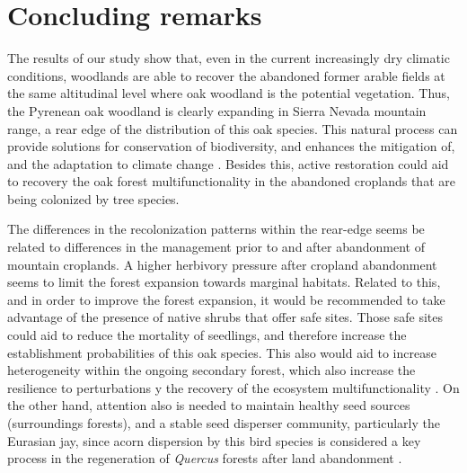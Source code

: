 \section{Concluding remarks}\label{sec:coloniza:Conclusion}
The results of our study show that, even in the current increasingly dry climatic conditions, \Qp woodlands are able to recover the abandoned former arable fields at the same altitudinal level where oak woodland is the potential vegetation. Thus, the Pyrenean oak woodland is clearly expanding in Sierra Nevada mountain range, a rear edge of the distribution of this oak species. This natural process can provide solutions for conservation of biodiversity, and enhances the mitigation of, and the adaptation to climate change \autocites[][and references therein]{Chazdonetal2020FosteringNatural}. Besides this, active restoration could aid to recovery the oak forest multifunctionality \autocite{CruzAlonsoetal2019LongTerm} in the abandoned croplands that are being colonized by tree species.

The differences in the recolonization patterns within the rear-edge seems be related to differences in the management prior to and after abandonment of mountain croplands. A higher herbivory pressure after cropland abandonment seems to limit the forest expansion towards marginal habitats. Related to this, and in order to improve the forest expansion, it would be recommended to take advantage of the presence of native shrubs that offer safe sites. Those safe sites could aid to reduce the mortality of \Qp seedlings, and therefore increase the establishment probabilities of this oak species. This also would aid to increase heterogeneity within the ongoing secondary forest, which also increase the resilience to perturbations y the recovery of the ecosystem multifunctionality \autocite{Stritihetal2021ImpactLanduse, CruzAlonsoetal2019LongTerm}. On the other hand, attention also is needed to maintain healthy seed sources (surroundings forests), and a stable seed disperser community, particularly the Eurasian jay, since acorn dispersion by this bird species is considered a key process in the regeneration of \emph{Quercus} forests after land abandonment \autocite{Pausasetal2006RegenerationMarginal}.
